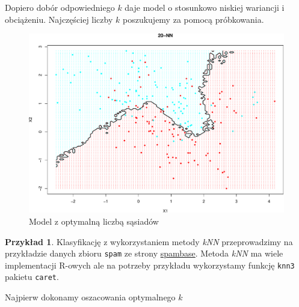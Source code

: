 \documentclass[
]{book}
\theoremstyle{plain}
\theoremstyle{definition}
\theoremstyle{definition}
\theoremstyle{definition}
\newtheorem{example}{Przykład}[chapter]
\theoremstyle{definition}
\theoremstyle{definition}
\theoremstyle{remark}
\begin{document}
Dopiero dobór odpowiedniego \(k\) daje model o stosunkowo niskiej wariancji i obciążeniu. Najczęściej liczby \(k\) poszukujemy za pomocą próbkowania.

\begin{figure}

{\centering \includegraphics{EksploracjaDanych_files/figure-latex/knn3-1} 

}

\caption{Model z optymalną liczbą sąsiadów}\label{fig:knn3}
\end{figure}

\begin{example}
\protect\hypertarget{exm:knnprzklad1}{}\label{exm:knnprzklad1}Klasyfikację z wykorzystaniem metody \emph{kNN} przeprowadzimy na przykładzie danych zbioru \texttt{spam} ze strony \href{https://archive.ics.uci.edu/dataset/94/spambase}{spambase}. Metoda \emph{kNN} ma wiele implementacji R-owych ale na potrzeby przykładu wykorzystamy funkcję \texttt{knn3} pakietu \texttt{caret}.

Najpierw dokonamy oszacowania optymalnego \(k\)
\end{example}
\end{document}
